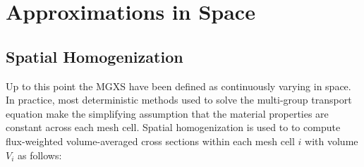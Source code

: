 


\section{Approximations in Space}
\label{sec:chap2-approx-space}

\subsection{Spatial Homogenization}
\label{subsec:chap2-space}



Up to this point the \ac{MGXS} have been defined as continuously varying in space. In practice, most deterministic methods used to solve the multi-group transport equation make the simplifying assumption that the material properties are constant across each mesh cell. Spatial homogenization is used to to compute flux-weighted volume-averaged cross sections within each mesh cell $i$ with volume $V_{i}$ as follows:

